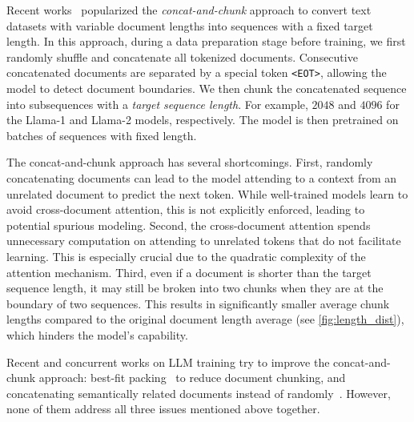 Recent works~\citep{ott2019fairseq,liu2019roberta,llama1,llama2} popularized the \emph{concat-and-chunk} approach to convert text datasets with variable document lengths into sequences with a fixed target length. In this approach, during a data preparation stage before training, we first randomly shuffle and concatenate all tokenized documents. Consecutive concatenated documents are separated by a special token \verb|<EOT>|, allowing the model to detect document boundaries. We then chunk the concatenated sequence into subsequences with a \emph{target sequence length}. For example, $2048$ and $4096$ for the Llama-1 and Llama-2 models, respectively. The model is then pretrained on batches of sequences with fixed length.


The concat-and-chunk approach has several shortcomings. First, randomly concatenating documents can lead to the model attending to a context from an unrelated document to predict the next token. While well-trained models learn to avoid cross-document attention, this is not explicitly enforced, leading to potential spurious modeling. Second, the cross-document attention spends unnecessary computation on attending to unrelated tokens that do not facilitate learning. This is especially crucial due to the quadratic complexity of the attention mechanism.
 Third, even if a document is shorter than the target sequence length, it may still be broken into two chunks when they are at the boundary of two sequences. This results in significantly smaller average chunk lengths compared to the original document length average (see \cref{fig:length_dist}), which hinders the model's capability.

Recent and concurrent works on LLM training try to improve the concat-and-chunk approach: 
 best-fit packing~\citep{ding2024fewer} to reduce document chunking, and concatenating semantically related documents instead of randomly~\cite{shi2023context}. However, none of them address all three issues mentioned above together.

